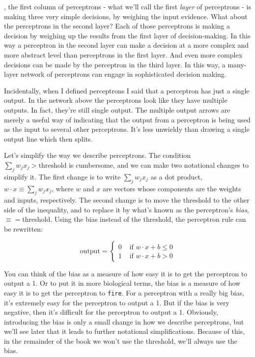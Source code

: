 , the first column of perceptrons - what we'll call the first \textit{layer} of perceptrons - is making three very simple decisions, by weighing the input evidence. What about the perceptrons in the second layer? Each of those perceptrons is making a decision by weighing up the results from the first layer of decision-making. In this way a perceptron in the second layer can make a decision at a more complex and more abstract level than perceptrons in the first layer. And even more complex decisions can be made by the perceptron in the third layer. In this way, a many-layer network of perceptrons can engage in sophisticated decision making.

Incidentally, when I defined perceptrons I said that a perceptron has just a single output. In the network above the perceptrons look like they have multiple outputs. In fact, they're still single output. The multiple output arrows are merely a useful way of indicating that the output from a perceptron is being used as the input to several other perceptrons. It's less unwieldy than drawing a single output line which then splits.

Let's simplify the way we describe perceptrons. The condition 
$\sum_{j} w_{j} x_{j}> \textrm{threshold}$
is cumbersome, and we can make two notational changes to simplify it. The first change is to write
 $\sum_{j} w_{j} x_{j}$ as a dot product, $w \cdot x \equiv \sum_{j} w_{j} x_{j}$, where $w$ and $x$ are vectors whose components are the weights and inputs, respectively. The second change is to move the threshold to the other side of the inequality, and to replace it by what's known as the perceptron's \textit{bias}, $\equiv=$threshold. Using the bias instead of the threshold, the perceptron rule can be rewritten: 

\begin{equation}
\textrm{output}
=\left\{\begin{array}{ll}{0} & {\textrm { if } w \cdot x+b \leq 0} \\ {1} & {\textrm { if } w \cdot x+b>0}\end{array}\right.
\end{equation}


You can think of the bias as a measure of how easy it is to get the perceptron to output a 1. Or to put it in more biological terms, the bias is a measure of how easy it is to get the perceptron to \lstinline{fire}. For a perceptron with a really big bias, it's extremely easy for the perceptron to output a 1. But if the bias is very negative, then it's difficult for the perceptron to output a 1. Obviously, introducing the bias is only a small change in how we describe perceptrons, but we'll see later that it leads to further notational simplifications. Because of this, in the remainder of the book we won't use the threshold, we'll always use the bias.

